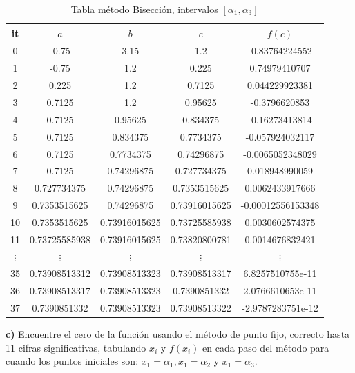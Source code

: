 \documentclass{article} %
\begin{document}
\begin{table}[H]
    \centering
    \begin{tabular}{|c|c|c|c|c|}
    \hline
it & $a$ & $b$ & $c$ & $f(c)$\\
\hline
0 & -0.75 & 3.15 & 1.2 & -0.83764224552\\
1 & -0.75 & 1.2 & 0.225 & 0.74979410707\\
2 & 0.225 & 1.2 & 0.7125 & 0.044229923381\\
3 & 0.7125 & 1.2 & 0.95625 & -0.3796620853\\
4 & 0.7125 & 0.95625 & 0.834375 & -0.16273413814\\
5 & 0.7125 & 0.834375 & 0.7734375 & -0.057924032117\\
6 & 0.7125 & 0.7734375 & 0.74296875 & -0.0065052348029\\
7 & 0.7125 & 0.74296875 & 0.727734375 & 0.018948990059\\
8 & 0.727734375 & 0.74296875 & 0.7353515625 & 0.0062433917666\\
9 & 0.7353515625 & 0.74296875 & 0.73916015625 & -0.00012556153348\\
10 & 0.7353515625 & 0.73916015625 & 0.73725585938 & 0.0030602574375\\
11 & 0.73725585938 & 0.73916015625 & 0.73820800781 & 0.0014676832421\\
$\vdots$ & $\vdots$ & $\vdots$ & $\vdots$ & $\vdots$\\
35 & 0.73908513312 & 0.73908513323 & 0.73908513317 & 6.8257510755e-11\\
36 & 0.73908513317 & 0.73908513323 & 0.7390851332 & 2.0766610653e-11\\
37 & 0.7390851332 & 0.73908513323 & 0.73908513322 & -2.9787283751e-12\\
\hline
\end{tabular}
    \caption{Tabla método Bisección, intervalos $[\alpha_1,\alpha_3]$}
    \label{tab2}
\end{table}

\textbf{c)} Encuentre el cero de la función usando el método de punto fijo, correcto hasta 11 cifras significativas, tabulando $x_i$ y $f(x_i)$ en cada paso del método para cuando los puntos iniciales son: $x_1 =\alpha_1, x_1 =\alpha_2$ y $x_1 = \alpha_3$.
\end{document}
